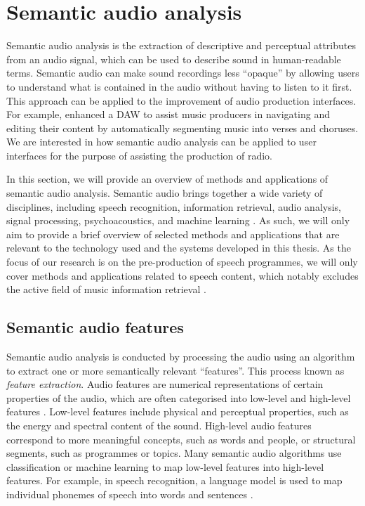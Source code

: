 \clearpage
\section{Semantic audio analysis}\label{sec:background-semantic}

Semantic audio analysis is the extraction of descriptive and perceptual attributes from an audio signal, which can be
used to describe sound in human-readable terms.  Semantic audio can make sound recordings less ``opaque'' by allowing
users to understand what is contained in the audio without having to listen to it first.  This approach can be applied
to the improvement of audio production interfaces. For example, \citet{Fazekas2007} enhanced a DAW to assist music
producers in navigating and editing their content by automatically segmenting music into verses and choruses.  We are
interested in how semantic audio analysis can be applied to user interfaces for the purpose of assisting the production
of radio.

In this section, we will provide an overview of methods and applications of semantic audio analysis.  Semantic audio
brings together a wide variety of disciplines, including speech recognition, information retrieval, audio analysis,
signal processing, psychoacoustics, and machine learning \citep{Foote1999}. As such, we will only aim to provide a
brief overview of selected methods and applications that are relevant to the technology used and the systems developed
in this thesis.  As the focus of our research is on the pre-production of speech programmes, we will only cover methods
and applications related to speech content, which notably excludes the active field of music information retrieval
\citep{Downie2008}.

\subsection{Semantic audio features}\label{sec:features}

Semantic audio analysis is conducted by processing the audio using an algorithm to extract one or more semantically
relevant ``features''. This process known as \textit{feature extraction}.  Audio features are numerical representations
of certain properties of the audio, which are often categorised into low-level and high-level features
\citep[p.~31]{Fazekas2012}.  Low-level features include physical and perceptual properties, such as the energy and
spectral content of the sound.  High-level audio features correspond to more meaningful concepts, such as words and
people, or structural segments, such as programmes or topics.  Many semantic audio algorithms use classification or
machine learning to map low-level features into high-level features. For example, in speech recognition, a
language model is used to map individual phonemes of speech into words and sentences \citep{Junqua1995}.









